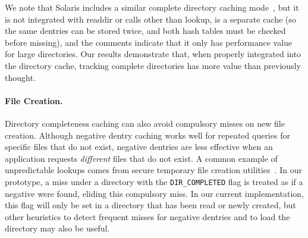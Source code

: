 
We note that Solaris includes a similar complete directory caching mode~\citep{solarisinternals},
but it is not integrated with readdir or calls other than lookup,
is a separate cache (so the same dentries can be stored twice, and both hash tables must be checked before missing),
and the comments indicate that it only has performance value for large directories.
Our results demonstrate that, when properly integrated into the directory cache,
tracking complete directories has more value than previously thought.



\paragraph{File Creation.}
Directory completeness caching can also avoid compulsory misses on new file creation.
Although negative dentry caching works well for repeated queries for specific files that do not exist,
negative dentries are less effective when an application requests 
{\em different} files that do not exist.
A common example of unpredictable lookups comes from secure temporary file creation utilities~\citep{tmpfiles}.
In our prototype, a miss under a directory with the {\tt DIR\_COMPLETED}
flag is treated as if a negative \dentry{} were found, eliding this compulsory miss.
In our current implementation, this flag will only be set in a directory that has been read 
or newly created, but other heuristics to detect frequent misses for negative dentries
and to load the directory may also be useful.



